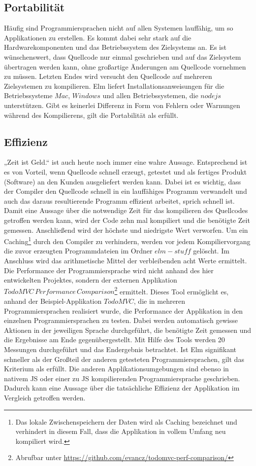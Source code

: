 \subsection{Portabilität}
\label{sec:muster_portabilitaet}
Häufig sind Programmiersprachen nicht auf allen Systemen lauffähig, um so Applikationen zu erstellen. Es kommt dabei sehr stark auf die Hardwarekomponenten und das Betriebssystem des Zielsystems an. Es ist wünschenswert, dass Quellcode nur einmal geschrieben und auf das Zielsystem übertragen werden kann, ohne großartige Änderungen am Quellcode vornehmen zu müssen. Letzten Endes wird versucht den Quellcode auf mehreren Zielsystemen zu kompilieren. Elm liefert Installationsanweisungen für die Betriebssysteme $Mac$, $Windows$ und allen Betriebssystemen, die $nodejs$ unterstützen. Gibt es keinerlei Differenz in Form von Fehlern oder Warnungen während des Kompilierens, gilt die Portabilität als erfüllt.


\subsection{Effizienz}
\label{sec:muster_effizienz}
„Zeit ist Geld.“ ist auch heute noch immer eine wahre Aussage. Entsprechend ist es von Vorteil, wenn Quellcode schnell erzeugt, getestet und als fertiges Produkt (Software) an den Kunden ausgeliefert werden kann. Dabei ist es wichtig, dass der Compiler den Quellcode schnell in ein lauffähiges Programm verwandelt und auch das daraus resultierende Programm effizient arbeitet, sprich schnell ist. Damit eine Aussage über die notwendige Zeit für das kompilieren des Quellcodes getroffen werden kann, wird der Code zehn mal kompiliert und die benötigte Zeit gemessen. Anschließend wird der höchste und niedrigste Wert verworfen. Um ein Caching\footnote{Das lokale Zwischenspeichern der Daten wird als Caching bezeichnet und verhindert in diesem Fall, dass die Applikation in vollem Umfang neu kompiliert wird.} durch den Compiler zu verhindern, werden vor jedem Kompiliervorgang die zuvor erzeugten Programmdateien im Ordner $elm-stuff$ gelöscht. Im Anschluss wird das arithmetische Mittel der verbleibenden acht Werte ermittelt.
Die Performance der Programmiersprache wird nicht anhand des hier entwickelten Projektes, sondern der externen Applikation $TodoMVC\,Performance\,Comparison$\footnote{Abrufbar unter \url{https://github.com/evancz/todomvc-perf-comparison/}} ermittelt. Dieses Tool ermöglicht es, anhand der Beispiel-Applikation $TodoMVC$, die in mehreren Programmiersprachen realisiert wurde, die Performance der Applikation in den einzelnen Programmiersprachen zu testen. Dabei werden automatisch gewisse Aktionen in der jeweiligen Sprache durchgeführt, die benötigte Zeit gemessen und die Ergebnisse am Ende gegenübergestellt. Mit Hilfe des Tools werden 20 Messungen durchgeführt und das Endergebnis betrachtet. Ist Elm signifikant schneller als der Großteil der anderen getesteten Programmiersprachen, gilt das Kriterium als erfüllt. Die anderen Applikationsumgebungen sind ebenso in nativem \ac{JS} oder einer zu \ac{JS} kompilierenden Programmiersprache geschrieben. Dadurch kann eine Aussage über die tatsächliche Effizienz der Applikation im Vergleich getroffen werden.


